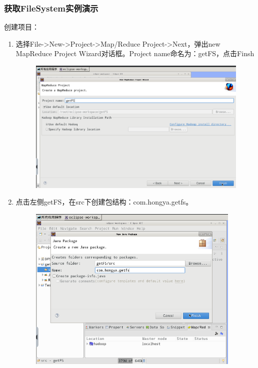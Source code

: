 \documentclass {article}
\begin{document}
			\subsubsection{获取FileSystem实例演示}
				创建项目：
				\begin{enumerate}
					\item 选择File->New->Project->Map/Reduce Project->Next，弹出new MapReduce Project Wizard对话框。Project name命名为：getFS，点击Finsh
					\begin{figure}[H]
						\centering
						\includegraphics[width=4.5in]{figures/fig12.png}
					\end{figure}
				
					\item 点击左侧getFS，在src下创建包结构：com.hongya.getfs。
					\begin{figure}[H]
						\centering
						\includegraphics[width=4in]{figures/fig13.png}
					\end{figure}
				

\end{enumerate}
\end{document}
